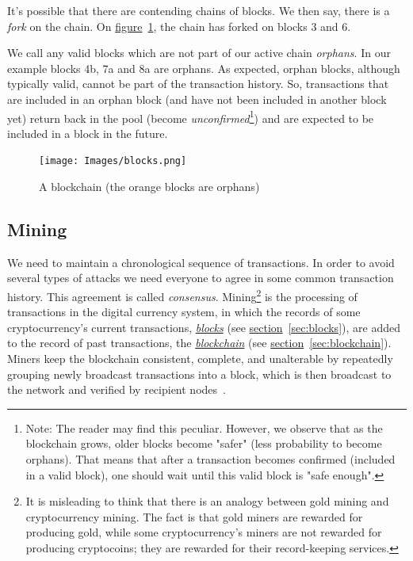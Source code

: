 It's possible that there are contending chains of blocks. We then say, there is a \emph{fork} on the chain. On \hyperref[fig:blocks]{figure}~\ref{fig:blocks}, the chain has forked on blocks 3 and 6.

We call any valid blocks which are not part of our active chain \emph{orphans}. In our example blocks 4b, 7a and 8a are orphans. As expected, orphan blocks, although typically valid, cannot be part of the transaction history. So, transactions that are included in an orphan block (and have not been included in another block yet) return back in the pool (become \emph{unconfirmed}\footnote{Note: The reader may find this peculiar. However, we observe that as the blockchain grows, older blocks become "safer" (less probability to become orphans). That means that after a transaction becomes confirmed (included in a valid block), one should wait until this valid block is "safe enough".}) and are expected to be included in a block in the future.

\vspace{0.3cm}
\begin{figure}[H]
  \centering
  \texttt{[image: Images/blocks.png]}
  \caption{A blockchain (the orange blocks are orphans)~\cite{mastering}}
  \label{fig:blocks}
\end{figure}

\subsection{Mining}
We need to maintain a chronological sequence of transactions. In order to avoid several types of attacks we need everyone to agree in some common transaction history. This agreement is called \emph{consensus}. Mining\footnote{It is misleading to think that there is an analogy between gold mining and cryptocurrency mining. The fact is that gold miners are rewarded for producing gold, while some cryptocurrency's miners are not rewarded for producing cryptocoins; they are rewarded for their record-keeping services.} is the processing of transactions in the digital currency system, in which the records of some cryptocurrency's current  transactions, \hyperref[sec:blocks]{\emph{blocks}} (see \hyperref[sec:blocks]{section}~\ref{sec:blocks}), are added to the record of past transactions, the \hyperref[sec:blockchain]{\emph{blockchain}} (see \hyperref[sec:blockchain]{section}~\ref{sec:blockchain}). Miners keep the blockchain consistent, complete, and unalterable by repeatedly grouping newly broadcast transactions into a block, which is then broadcast to the network and verified by recipient nodes~\cite{economist}.

